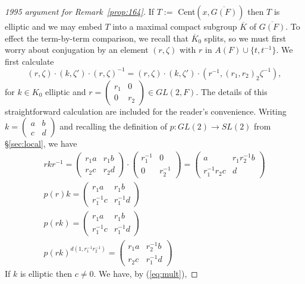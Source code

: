 \documentclass[12pt,letterpaper]{book}
\theoremstyle{plain}
\theoremstyle{definition}
\theoremstyle{remark}
\theoremstyle{remark}
\begin{document}
\begin{proof}[1995 argument for Remark~\ref{prop:164}]
If $T:=$ Cent$(x,\overline{G(F)})$ then $T$ is elliptic and we may embed $T$ into a maximal
compact subgroup $\overline{K}$ of $\overline{G(F)}$.
To effect the term-by-term comparison, we recall that $\overline{K}_0$
splits, so we must first worry about conjugation by
an element $(r,\zeta)$ with $r$ in $A(F)\cup \{t,t^{-1}\}$.
We first calculate
$$
(r,\zeta)\cdot (k,\zeta')\cdot ( r,\zeta)^{-1}
=(r,\zeta)\cdot (k,\zeta')\cdot (r^{-1},(r_1,r_2)_2\zeta^{-1} ),
$$
for $k\in K_0$ elliptic
and $r=\left(\begin{array}{cc} r_1&0\\0&r_2\end{array}\right)\in
GL(2,F)$. The details of this straightforward calculation are
included for the
reader's convenience. Writing
$k=\left(\begin{array}{cc} a&b\\c&d\end{array}\right)$ and
recalling the definition of $p:GL(2)\rightarrow SL(2)$ from \S\ref{sec:local}, we have
\begin{equation}
\begin{array}{c}
rkr^{-1}=\left(\begin{array}{cc} r_1a&r_1b\\r_2c&r_2d\end{array}\right)\cdot
\left(\begin{array}{cc} r_1^{-1}&0\\0&r_2^{-1}\end{array}\right)
=\left(\begin{array}{cc} a&r_1r_2^{-1}b\\r_1^{-1}r_2c&d\end{array}\right)\\
p(r)k=
\left(\begin{array}{cc} r_1a&r_1b\\r_1^{-1}c&r_1^{-1}d\end{array}\right)\\
p(rk)=
\left(\begin{array}{cc} r_1a&r_1b\\r_1^{-1}c&r_1^{-1}d\end{array}\right)\\
p(rk)^{d(1,r_1^{-1}r_2^{-1})}=
\left(\begin{array}{cc} r_1a&r_2^{-1}b\\r_2c&r_1^{-1}d\end{array}\right)
\end{array}
\end{equation}
If $k$ is elliptic then $c\not= 0$. We have, by (\ref{eq:mult}), 

\end{proof}
\end{document}
